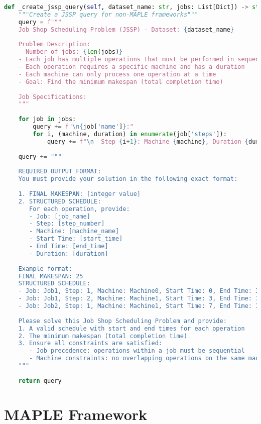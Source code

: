 \documentclass[11pt]{article}
\begin{document}
\begin{lstlisting}[language=Python, caption=Base JSSP Query Generation]
def _create_jssp_query(self, dataset_name: str, jobs: List[Dict]) -> str:
    """Create a JSSP query for non-MAPLE frameworks"""
    query = f"""
    Job Shop Scheduling Problem (JSSP) - Dataset: {dataset_name}
    
    Problem Description:
    - Number of jobs: {len(jobs)}
    - Each job has multiple operations that must be performed in sequence
    - Each operation requires a specific machine and has a duration
    - Each machine can only process one operation at a time
    - Goal: Find the minimum makespan (total completion time)
    
    Job Specifications:
    """
    
    for job in jobs:
        query += f"\n{job['name']}:"
        for i, (machine, duration) in enumerate(job['steps']):
            query += f"\n  Step {i+1}: Machine {machine}, Duration {duration}"
    
    query += """
    
    REQUIRED OUTPUT FORMAT:
    You must provide your solution in the following exact format:
    
    1. FINAL MAKESPAN: [integer value]
    2. STRUCTURED SCHEDULE:
       For each operation, provide:
       - Job: [job_name]
       - Step: [step_number]
       - Machine: [machine_name]
       - Start Time: [start_time]
       - End Time: [end_time]
       - Duration: [duration]
    
    Example format:
    FINAL MAKESPAN: 25
    STRUCTURED SCHEDULE:
    - Job: Job1, Step: 1, Machine: Machine0, Start Time: 0, End Time: 3, Duration: 3
    - Job: Job1, Step: 2, Machine: Machine1, Start Time: 3, End Time: 7, Duration: 4
    - Job: Job2, Step: 1, Machine: Machine1, Start Time: 7, End Time: 10, Duration: 3
    
    Please solve this Job Shop Scheduling Problem and provide:
    1. A valid schedule with start and end times for each operation
    2. The minimum makespan (total completion time)
    3. Ensure all constraints are satisfied:
       - Job precedence: operations within a job must be sequential
       - Machine constraints: no overlapping operations on the same machine
    """
    
    return query
\end{lstlisting}

\section{MAPLE Framework}
\end{document}
